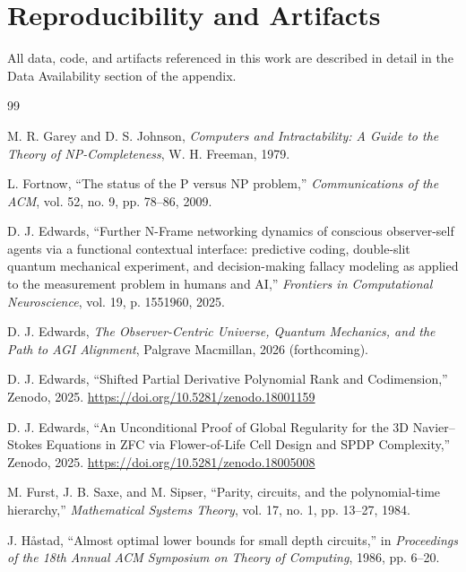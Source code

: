 \documentclass[12pt]{article}
\theoremstyle{definition}
\theoremstyle{definition}
\theoremstyle{remark}
\theoremstyle{remark}
\begin{document}
\section*{Reproducibility and Artifacts}
All data, code, and artifacts referenced in this work are described in detail in the Data Availability section of the appendix.



\begin{thebibliography}{99}

M. R. Garey and D. S. Johnson, \emph{Computers and Intractability: A Guide to the Theory of NP-Completeness}, W. H. Freeman, 1979.

L. Fortnow, ``The status of the P versus NP problem,'' \emph{Communications of the ACM}, vol. 52, no. 9, pp. 78--86, 2009.

D. J. Edwards, ``Further N-Frame networking dynamics of conscious observer-self agents via a functional contextual interface: predictive coding, double-slit quantum mechanical experiment, and decision-making fallacy modeling as applied to the measurement problem in humans and AI,'' \emph{Frontiers in Computational Neuroscience}, vol. 19, p. 1551960, 2025.

D. J. Edwards, \emph{The Observer-Centric Universe, Quantum Mechanics, and the Path to AGI Alignment}, Palgrave Macmillan, 2026 (forthcoming).

D. J. Edwards, ``Shifted Partial Derivative Polynomial Rank and Codimension,'' Zenodo, 2025. \url{https://doi.org/10.5281/zenodo.18001159}

D. J. Edwards, ``An Unconditional Proof of Global Regularity for the 3D Navier--Stokes Equations in ZFC via Flower-of-Life Cell Design and SPDP Complexity,'' Zenodo, 2025. \url{https://doi.org/10.5281/zenodo.18005008}

M. Furst, J. B. Saxe, and M. Sipser, ``Parity, circuits, and the polynomial-time hierarchy,'' \emph{Mathematical Systems Theory}, vol. 17, no. 1, pp. 13--27, 1984.

J. H\aa stad, ``Almost optimal lower bounds for small depth circuits,'' in \emph{Proceedings of the 18th Annual ACM Symposium on Theory of Computing}, 1986, pp. 6--20.


\end{thebibliography}
\end{document}
